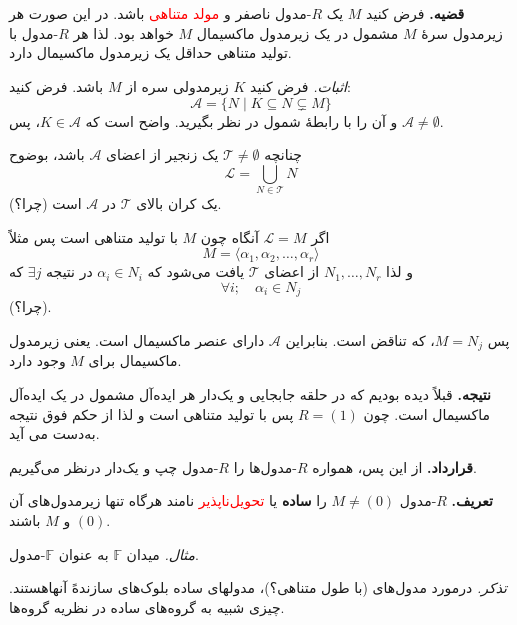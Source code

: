 \section{}

\textbf{قضیه.} فرض کنید $M$ یک $R$-مدول ناصفر و \textcolor{red}{مولد متناهی} باشد. در این صورت هر زیرمدول سرهٔ $M$ مشمول در یک زیرمدول ماکسیمال $M$ خواهد بود. لذا هر $R$-مدول با تولید متناهی حداقل یک زیرمدول ماکسیمال دارد.

\textit{اثبات.} فرض کنید $K$ زیرمدولی سره از $M$ باشد. فرض کنید:
\[
    \mathcal{A} = \{ N \mid K \subseteq N \subsetneq M \}
\]
و آن را با رابطهٔ شمول در نظر بگیرید. واضح است که
$K \in \mathcal{A}$،
پس
$\mathcal{A} \neq \emptyset$.

چنانچه
$\mathcal{T} \neq \emptyset$
یک زنجیر از اعضای
$\mathcal{A}$
باشد، بوضوح
\[
    \mathcal{L} = \bigcup_{N \in \mathcal{T}} N
\]
یک کران بالای
\(\mathcal{T}\)
در $\mathcal{A}$ است (چرا؟).

اگر
\(\mathcal{L} = M\)
آنگاه چون
\(M\)
با تولید متناهی است پس مثلاً
\[
    M = \langle \alpha_1, \alpha_2, \dots, \alpha_r \rangle
\]
و لذا
$N_1, \dots, N_r$
از اعضای
$\mathcal{T}$
یافت می‌شود که
$\alpha_i \in N_i$
در نتیجه
$\exists j$
که
\[
    \forall i; \quad  \alpha_i \in N_j
\]
(چرا؟).

پس
$M = N_j$، که تناقض است.
بنابراین
$\mathcal{A}$
دارای عنصر ماکسیمال است.
یعنی زیرمدول ماکسیمال برای
\(M\)
وجود دارد.

\hrulefill

\textbf{نتیجه.} قبلاً دیده بودیم که در حلقه جابجایی و یک‌دار
هر ایده‌آل مشمول در یک ایده‌آل ماکسیمال است. چون
\(R = (1)\)
پس با تولید متناهی است و لذا از حکم فوق نتیجه به‌دست می آید.



\hrulefill

\textbf{قرارداد.} از این پس، همواره $R$-مدول‌ها را $R$-مدول چپ و یک‌دار درنظر می‌گیریم.

\hrulefill

\textbf{تعریف.} $R$-مدول $M \neq (0)$ را \textbf{ساده} یا \textcolor{red}{تحویل‌ناپذیر} نامند هرگاه تنها زیرمدول‌های آن $(0)$ و $M$ باشند.

\hrulefill

\textit{مثال.} میدان $\mathbb{F}$ به عنوان $\mathbb{F}$-مدول.

\hrulefill

\textit{تذکر.}
درمورد مدول‌های (با طول متناهی؟)، مدولهای ساده بلوک‌های سازندهً آنهاهستند. چیزی شبیه به گروه‌های ساده در نظریه گروه‌‌ها.

